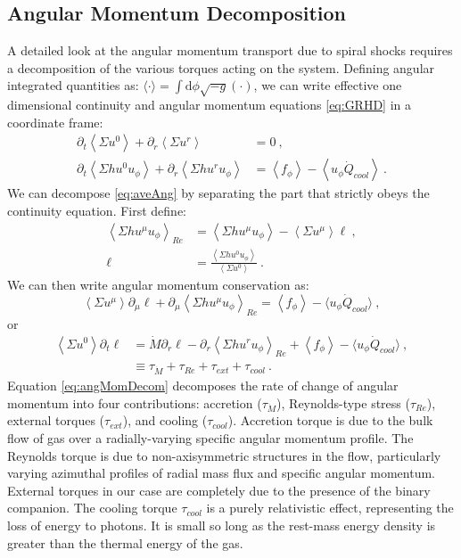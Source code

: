 \documentclass{emulateapj}
\newcommand{\Sig}{\Sigma}
\newcommand{\dd}{\mbox{d}}
\newcommand{\ave}[1]{\left \langle #1 \right \rangle}
\newcommand{\avet}[1]{ \langle #1 \rangle}
\newcommand{\aveRe}[1]{\left \langle #1 \right \rangle_{Re}}
\begin{document}
\subsection{Angular Momentum Decomposition}
\label{subsec:angMomDecom}

A detailed look at the angular momentum transport due to spiral shocks requires a decomposition of the various torques acting on the system. Defining angular integrated quantities as: $\avet{\cdot} = \int \dd \phi \sqrt{-g} (\cdot)$, we can write effective one dimensional continuity and angular momentum equations \eqref{eq:GRHD} in a coordinate frame:
\begin{align}
	\partial_t \ave{\Sig u^0} + \partial_r \ave{\Sig u^r} &= 0 \ ,\label{eq:aveAng}\\
	\partial_t \ave{\Sig h u^0 u_\phi} + \partial_r \ave{\Sig h u^r u_\phi} &= \ave{f_\phi}- \ave{u_\phi \dot{Q}_{cool}} \ .\nonumber
\end{align} 
We can decompose \eqref{eq:aveAng} by separating the part that strictly obeys the continuity equation.  First define:
\begin{align*}
	\aveRe{\Sig h u^\mu u_\phi} &= \ave{\Sig h u^\mu u_\phi} - \ave{\Sig u^\mu} \ell \ , \\
	\ell &= \frac{\ave{\Sig h u^0 u_\phi}}{\ave{\Sig u^0} } \ .
\end{align*}
We can then write angular momentum conservation as:
\begin{equation}
	\ave{\Sig u^\mu} \partial_\mu \ell + \partial_\mu \aveRe{\Sig h u^\mu u_\phi} =  \ave{f_\phi}- \langle u_\phi \dot{Q}_{cool} \rangle \ , 
\end{equation}
or
\begin{align}
	\ave{\Sig u^0} \partial_t \ell &= \dot{M} \partial_r \ell -  \partial_r \aveRe{\Sig h u^r u_\phi} +  \ave{f_\phi}- \langle u_\phi \dot{Q}_{cool} \rangle \ , \nonumber \\
	&\equiv \tau_{\dot{M}} + \tau_{Re} + \tau_{ext} + \tau_{cool} \ . \label{eq:angMomDecom}
\end{align} 
Equation \eqref{eq:angMomDecom} decomposes the rate of change of angular momentum into four contributions: accretion ($\tau_{\dot{M}}$), Reynolds-type stress ($\tau_{Re}$), external torques ($\tau_{ext}$), and cooling ($\tau_{cool}$).  Accretion torque is due to the bulk flow of gas over a radially-varying specific angular momentum profile. The Reynolds torque is due to non-axisymmetric structures in the flow, particularly varying azimuthal profiles of radial mass flux and specific angular momentum. External torques in our case are completely due to the presence of the binary companion. The cooling torque $\tau_{cool}$ is a purely relativistic effect, representing the loss of energy to photons. It is small so long as the rest-mass energy density is greater than the thermal energy of the gas.
\end{document}
